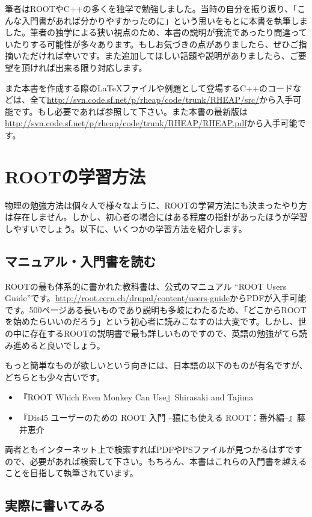 筆者はROOTやC++の多くを独学で勉強しました。当時の自分を振り返り、「こんな入門書があれば分かりやすかったのに」という思いをもとに本書を執筆しました。筆者の独学による狭い視点のため、本書の説明が我流であったり間違っていたりする可能性が多々あります。もしお気づきの点がありましたら、ぜひご指摘いただければ幸いです。また追加してほしい話題や説明がありましたら、ご要望を頂ければ出来る限り対応します。

また本書を作成する際の{\LaTeX}ファイルや例題として登場するC++のコードなどは、全て\url{http://svn.code.sf.net/p/rheap/code/trunk/RHEAP/src/}から入手可能です。もし必要であれば参照して下さい。また本書の最新版は\url{http://svn.code.sf.net/p/rheap/code/trunk/RHEAP/RHEAP.pdf}から入手可能です。

\section{ROOTの学習方法}
物理の勉強方法は個々人で様々なように、ROOTの学習方法にも決まったやり方は存在しません。しかし、初心者の場合にはある程度の指針があったほうが学習しやすいでしょう。以下に、いくつかの学習方法を紹介します。
\subsection{マニュアル・入門書を読む}
ROOTの最も体系的に書かれた教科書は、公式のマニュアル ``ROOT Users Guide''です。\url{http://root.cern.ch/drupal/content/users-guide}からPDFが入手可能です。500ページある長いものであり説明も多岐にわたるため、「どこからROOTを始めたらいいのだろう」という初心者に読みこなすのは大変です。しかし、世の中に存在するROOTの説明書で最も詳しいものですので、英語の勉強がてら読み進めると良いでしょう。

もっと簡単なものが欲しいという向きには、日本語の以下のものが有名ですが、どちらとも少々古いです。
\begin{itemize}
  \item 『ROOT Which Even Monkey Can Use』Shirasaki and Tajima
  \item 『Dis45 ユーザーのための ROOT 入門 --猿にも使える ROOT：番外編--』藤井恵介
\end{itemize}
両者ともインターネット上で検索すればPDFやPSファイルが見つかるはずですので、必要があれば検索して下さい。もちろん、本書はこれらの入門書を越えることを目指して執筆されています。

\subsection{実際に書いてみる}

